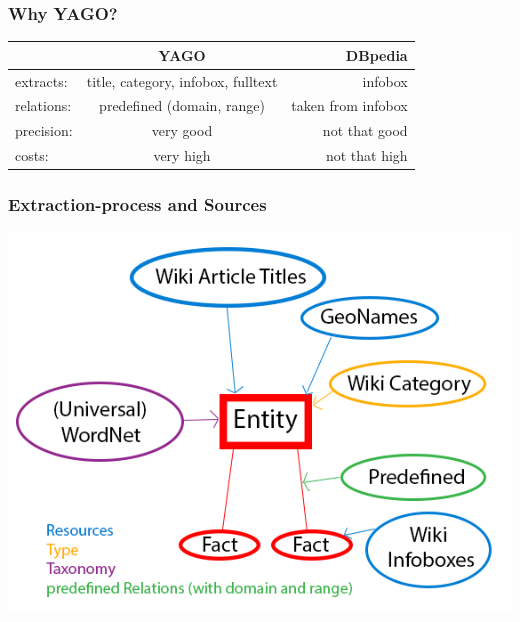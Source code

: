 \begin{frame}
\frametitle{Why YAGO?}
\begin{tabular}{l|c|r}
& YAGO & DBpedia\\
\hline 
extracts: & title, category, infobox, fulltext & infobox\\
relations: & predefined (domain, range) & taken from infobox\\
precision: & very good & not that good \\
costs: & very high & not that high

\end{tabular}
\end{frame}

\begin{frame}
\frametitle{Extraction-process and Sources}
\includegraphics[scale=0.35]{img/yago-ex1.png}
\end{frame}

